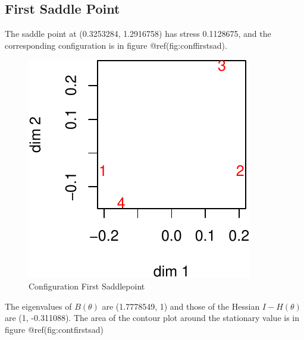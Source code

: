\documentclass[
  12pt,
  letterpaper,
  DIV=11,
  numbers=noendperiod]{scrreprt}
\theoremstyle{remark}
\begin{document}
\subsection{First Saddle Point}\label{first-saddle-point}

The saddle point at (0.3253284, 1.2916758) has stress 0.1128675, and the
corresponding configuration is in figure @ref(fig:conffirstsad).

\begin{figure}[H]

{\centering \includegraphics{spaces_files/figure-pdf/conffirstsad-1.pdf}

}

\caption{Configuration First Saddlepoint}

\end{figure}%

The eigenvalues of \(B(\theta)\) are (1.7778549, 1) and those of the
Hessian \(I-H(\theta)\) are (1, -0.311088). The area of the contour plot
around the stationary value is in figure @ref(fig:contfirstsad)
\end{document}
